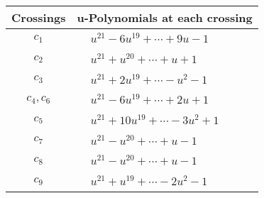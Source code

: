 \documentclass[1p]{elsarticle_modified}
\theoremstyle{definition}
\begin{document}
\begin{tabular}{m{50pt}|m{274pt}}
Crossings & \hspace{64pt}u-Polynomials at each crossing \\
\hline $$\begin{aligned}c_{1}\end{aligned}$$&$\begin{aligned}
&u^{21}-6 u^{19}+\cdots+9 u-1
\end{aligned}$\\
\hline $$\begin{aligned}c_{2}\end{aligned}$$&$\begin{aligned}
&u^{21}+u^{20}+\cdots+u+1
\end{aligned}$\\
\hline $$\begin{aligned}c_{3}\end{aligned}$$&$\begin{aligned}
&u^{21}+2 u^{19}+\cdots- u^2-1
\end{aligned}$\\
\hline $$\begin{aligned}c_{4},c_{6}\end{aligned}$$&$\begin{aligned}
&u^{21}-6 u^{19}+\cdots+2 u+1
\end{aligned}$\\
\hline $$\begin{aligned}c_{5}\end{aligned}$$&$\begin{aligned}
&u^{21}+10 u^{19}+\cdots-3 u^2+1
\end{aligned}$\\
\hline $$\begin{aligned}c_{7}\end{aligned}$$&$\begin{aligned}
&u^{21}- u^{20}+\cdots+u-1
\end{aligned}$\\
\hline $$\begin{aligned}c_{8}\end{aligned}$$&$\begin{aligned}
&u^{21}- u^{20}+\cdots+u-1
\end{aligned}$\\
\hline $$\begin{aligned}c_{9}\end{aligned}$$&$\begin{aligned}
&u^{21}+u^{19}+\cdots-2 u^2-1
\end{aligned}$\\

\end{tabular}
\end{document}
